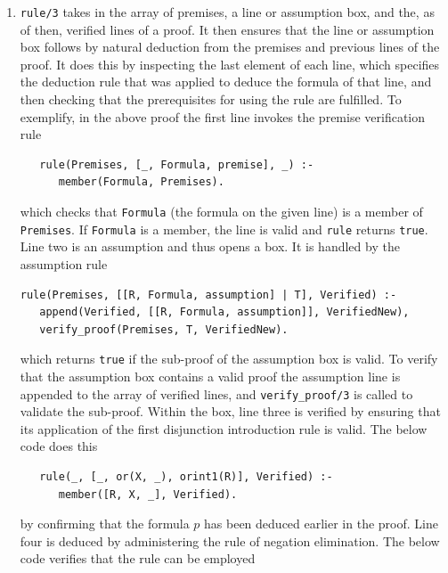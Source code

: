 \documentclass[a4paper, 11pt]{article}
\begin{document}
\begin{enumerate}
      \item \texttt{rule/3} takes in the array of premises, a
            line or assumption box, and the, as of then, 
            verified lines of a proof. It then ensures that
            the line or assumption box follows by natural
            deduction from the premises and previous lines of
            the proof. It does this by inspecting the last
            element of each line, which specifies the
            deduction rule that was applied to deduce the
            formula of that line, and then checking that the
            prerequisites for using the rule are fulfilled.
            To exemplify, in the above proof the first line
            invokes the premise verification rule

\begin{verbatim}
   rule(Premises, [_, Formula, premise], _) :-
      member(Formula, Premises).
\end{verbatim}
                    
            which checks that \texttt{Formula} (the formula
            on the given line) is a member of
            \texttt{Premises}. If \texttt{Formula} is a
            member, the line is valid and \texttt{rule} returns
            \texttt{true}. Line two is an assumption and thus 
            opens a box. It is handled by the assumption rule

\begin{verbatim}
rule(Premises, [[R, Formula, assumption] | T], Verified) :-
   append(Verified, [[R, Formula, assumption]], VerifiedNew),
   verify_proof(Premises, T, VerifiedNew).
\end{verbatim}

            which returns \texttt{true} if the sub-proof of the
            assumption box is valid. To verify that the
            assumption box contains a valid proof the
            assumption line is appended to the array of
            verified lines, and \texttt{verify\_proof/3} is
            called to validate the sub-proof. Within the box,
            line three is verified by ensuring that its
            application of the first disjunction introduction
            rule is valid. The below code does this

\begin{verbatim}
   rule(_, [_, or(X, _), orint1(R)], Verified) :-
      member([R, X, _], Verified).
\end{verbatim}

            by confirming that the formula $p$ has been
            deduced earlier in the proof. Line four is deduced
            by administering the rule of negation elimination.
            The below code verifies that the rule can be
            employed


\end{enumerate}
\end{document}
